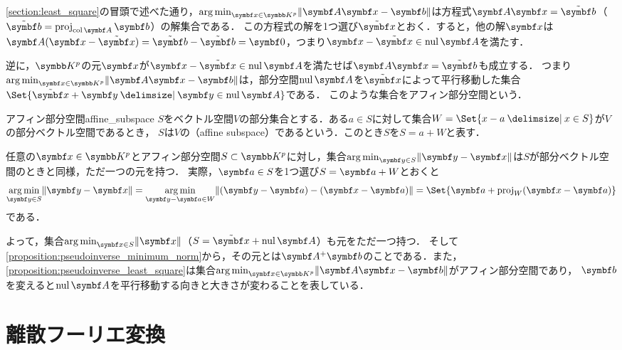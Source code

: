 \documentclass[../../main]{subfiles}
\begin{document}
\cref{section:least_square}の冒頭で述べた通り，\(\argmin_{\vect{x}\in\numset{K}^p}\vnorm{\mat{A}\vect{x}-\vect{b}}\)は方程式\(\mat{A}\vect{x}=\tilde{\vect{b}}\)（\(\tilde{\vect{b}}=\proj_{\colsp\mat{A}}\vect{b}\)）の解集合である．
この方程式の解を1つ選び\(\tilde{\vect{x}}\)とおく．すると，他の解\(\vect{x}\)は\(\mat{A}(\vect{x}-\tilde{\vect{x}})=\tilde{\vect{b}}-\tilde{\vect{b}}=\zvec\)，つまり\(\vect{x}-\tilde{\vect{x}}\in\nulsp\mat{A}\)を満たす．

逆に，\(\numset{K}^p\)の元\(\vect{x}\)が\(\vect{x}-\tilde{\vect{x}}\in\nulsp\mat{A}\)を満たせば\(\mat{A}\vect{x}=\tilde{\vect{b}}\)も成立する．
つまり\(\argmin_{\vect{x}\in\numset{K}^p}\vnorm{\mat{A}\vect{x}-\vect{b}}\)は，部分空間\(\nulsp\mat{A}\)を\(\tilde{\vect{x}}\)によって平行移動した集合\(\Set{\tilde{\vect{x}}+\vect{y}\given\vect{y}\in\nulsp\mat{A}}\)である．
このような集合をアフィン部分空間という．

\begin{definition}{アフィン部分空間}{affine_subspace}
  \(S\)をベクトル空間\(V\)の部分集合とする．ある\(a\in S\)に対して集合\(W=\Set{x-a\given x\in S}\)が\(V\)の部分ベクトル空間であるとき，
  \(S\)は\(V\)の（affine subspace）であるという．このとき\(S\)を\(S=a+W\)と表す．
\end{definition}

任意の\(\vect{x}\in\numset{K}^p\)とアフィン部分空間\(S\subset\numset{K}^p\)に対し，集合\(\argmin_{\vect{y}\in S}\vnorm{\vect{y}-\vect{x}}\)は\(S\)が部分ベクトル空間のときと同様，ただ一つの元を持つ．
実際，\(\vect{a}\in S\)を1つ選び\(S=\vect{a}+W\)とおくと
\[
  \argmin_{\vect{y}\in S}\vnorm{\vect{y}-\vect{x}} = \argmin_{\vect{y}-\vect{a}\in W}\vnorm{(\vect{y}-\vect{a})-(\vect{x}-\vect{a})}
  = \Set{\vect{a}+\proj_W(\vect{x}-\vect{a})}
\]
である．

よって，集合\(\argmin_{\vect{x}\in S}\vnorm{\vect{x}}\)（\(S=\tilde{\vect{x}}+\nulsp\mat{A}\)）も元をただ一つ持つ．
そして\cref{proposition:pseudoinverse_minimum_norm}から，その元とは\(\pinv{\mat{A}}\vect{b}\)のことである．また，\cref{proposition:pseudoinverse_least_square}は集合\(\argmin_{\vect{x}\in\numset{K}^p}\vnorm{\mat{A}\vect{x}-\vect{b}}\)がアフィン部分空間であり，
\(\vect{b}\)を変えると\(\nulsp\mat{A}\)を平行移動する向きと大きさが変わることを表している．

\section{離散フーリエ変換}
\end{document}
